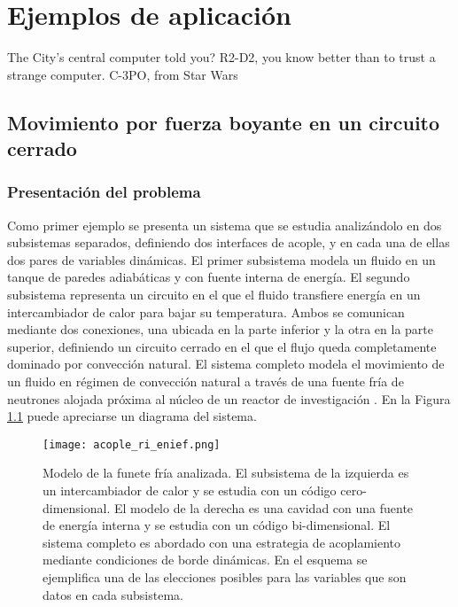 \chapter{Ejemplos de aplicación}
\label{chap3}
\chapterquote
{The City's central computer told you? R2-D2, you know better than to trust a strange computer. }
{C-3PO, from Star Wars}

\section{Movimiento por fuerza boyante en un circuito cerrado}
\label{3:ff}

\subsection*{Presentación del problema}
Como primer ejemplo se presenta un sistema que se estudia analizándolo en dos subsistemas separados,
definiendo dos interfaces de acople,
y en cada una de ellas dos pares de variables dinámicas.
El primer subsistema modela un fluido en un tanque de paredes adiabáticas y con fuente interna de energía. 
El segundo subsistema representa un circuito en el que el fluido transfiere energía en un intercambiador de calor para bajar su temperatura.
Ambos se comunican mediante dos conexiones, una ubicada en la parte inferior y la otra en la parte superior,
definiendo un circuito cerrado en el que el flujo queda completamente dominado por convección natural.
El sistema completo modela el movimiento de un fluido en régimen de convección natural a través de
una fuente fría de neutrones alojada próxima al núcleo de un reactor de investigación \cite{fuente-fria}.
En la Figura \ref{esquemaFuenteFria} puede apreciarse un diagrama del sistema.

\begin{figure}[ht]
\centering{}\texttt{[image: acople\_ri\_enief.png]}
\caption[Modelo de la fuente fría compuesto por un subsistemas cero-dimensional y otro subsistema bi-dimensional.]
{Modelo de la funete fría analizada. 
El subsistema de la izquierda es un intercambiador de calor y se estudia con un código cero-dimensional.
El modelo de la derecha es una cavidad con una fuente de energía interna y se estudia con un código bi-dimensional.
El sistema completo es abordado con una estrategia de acoplamiento mediante condiciones de borde dinámicas.
En el esquema se ejemplifica una de las elecciones posibles para las variables que son datos en cada subsistema.}
\label{esquemaFuenteFria}
\end{figure}

